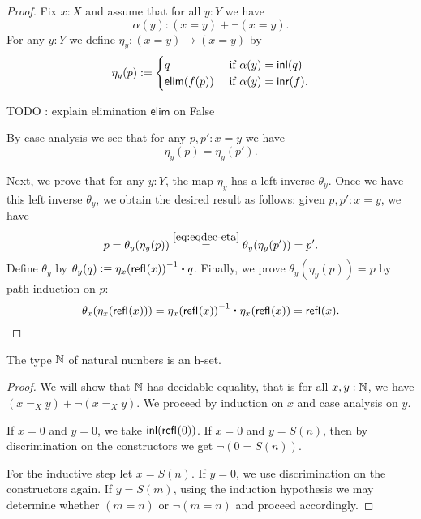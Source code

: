\begin{proof}
Fix $x : X$ and assume that for all $y : Y$ we have
  \[\alpha(y) : (x = y) + \neg (x = y). \]
  For any $y : Y$ we define
      $  \eta_y : (x = y) \to (x = y) $
    by
    \[ \eta_y(p) := \begin{cases}
                     q & \text{ if } \alpha(y) = \mathsf{inl}(q) \\
                     \mathsf{elim}(f(p)) & \text{ if } \alpha(y) = \mathsf{inr}(f).
                    \end{cases}
\]

TODO : explain elimination $\mathsf{elim}$ on False

\noindent
 By case analysis we see that for any $p, p' : x = y$ we have
 \begin{equation}\eta_y(p) = \eta_y(p') . \label{eq:eqdec-eta}\end{equation}

 \noindent
 Next, we prove that for any $y : Y$, the map $\eta_y$ has a left inverse $\theta_y$.
   Once we have this left inverse $\theta_y$, we obtain the desired result as follows: given
     $p, p' : x = y$, we have
   \[ p = \theta_y (\eta_y(p)) \stackrel{\ref{eq:eqdec-eta}}{=} \theta_y (\eta_y(p')) = p' . \]
 Define $\theta_y$ by
     $\theta_y(q) \defeq \opp{\eta_x(\refl{}(x))} \ct q$.
  Finally, we prove $\theta_y(\eta_y(p)) = p$ by path induction on $p$:
   \[\theta_x(\eta_x(\refl{}(x))) = \opp{\eta_x(\refl{}(x))} \ct \eta_x(\refl{}(x)) = \refl{}(x). \]

\end{proof}

\begin{thm}\label{prop:nat-is-set}
 The type $\mathbb{N}$ of natural numbers is an h-set.
\end{thm}

\begin{proof}
 We will show that $\mathbb{N}$ has decidable equality, that is for all $x, y : \mathbb{N}$, we have $(x =_X y) + \neg (x =_X y)$.
 We proceed by induction on $x$ and case analysis on $y$.

 If $x = 0$ and $y = 0$, we take $\mathsf{inl}(\mathsf{refl}_{}(0))$. If $x = 0$ and $y = S(n)$,
 then by discrimination on the constructors we get $\neg (0 = S (n))$.

 For the inductive step let $x = S (n)$. If $y = 0$, we use discrimination on the constructors again.
 If $y = S (m)$, using the induction hypothesis we may determine whether $(m = n)$ or $\neg(m = n)$ and proceed accordingly.
\end{proof}

